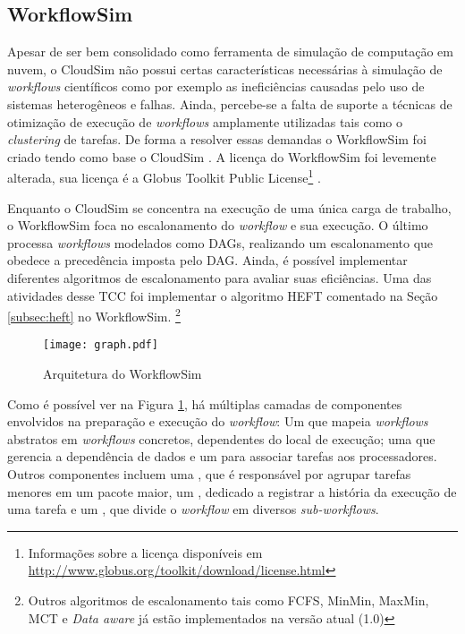\subsection{WorkflowSim}
\label{subsec:workflowsim}
Apesar de ser bem consolidado como ferramenta de simulação de computação em nuvem,
o CloudSim não possui certas características necessárias à simulação de 
\emph{workflows} científicos como por exemplo as ineficiências causadas pelo
uso de sistemas heterogêneos e falhas. Ainda, percebe-se a falta de suporte a 
técnicas de otimização de execução de \emph{workflows} amplamente utilizadas
tais como o \emph{clustering} de tarefas. De forma a resolver essas demandas
o WorkflowSim foi criado tendo como base o CloudSim \cite{chen:workflowsim}.
A licença do WorkflowSim foi levemente alterada, sua licença é a Globus Toolkit
Public License\footnote{Informações sobre a licença disponíveis em 
\url{http://www.globus.org/toolkit/download/license.html}}
\cite{workflowsim:license}.

Enquanto o CloudSim se concentra na execução de uma única carga de trabalho,
o WorkflowSim foca no escalonamento do \emph{workflow} e sua execução. O último
processa \emph{workflows} modelados como DAGs, realizando um escalonamento que 
obedece a precedência imposta pelo DAG. Ainda, é possível implementar diferentes
algoritmos de escalonamento para avaliar suas eficiências. Uma das atividades desse
TCC foi implementar o algoritmo HEFT comentado na Seção \ref{subsec:heft} no 
WorkflowSim. \footnote{Outros algoritmos de escalonamento tais como FCFS, 
MinMin, MaxMin, MCT e \emph{Data aware} já estão implementados na versão atual
(1.0)}

\begin{figure}[ht]
\centering
\texttt{[image: graph.pdf]}
\caption{Arquitetura do WorkflowSim}
\label{fig:arquitetura_workflowsim}
\end{figure}

Como é possível ver na Figura \ref{fig:arquitetura_workflowsim}, há múltiplas 
camadas de componentes envolvidos na preparação e execução do \emph{workflow}:
Um  que mapeia \emph{workflows} abstratos em
\emph{workflows} concretos, dependentes do local de execução; uma  que gerencia a dependência de dados e um  para 
associar tarefas aos processadores. Outros componentes incluem uma , que é responsável por agrupar tarefas menores em um pacote maior, um
, dedicado a registrar a história da execução de uma
tarefa e um , que divide o \emph{workflow} em diversos
\emph{sub-workflows}. 

